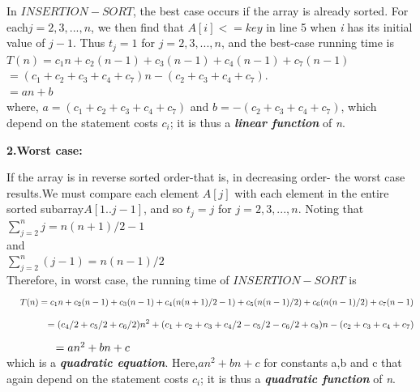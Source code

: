 \documentclass[12 pt,a4paper]{report}
\begin{document}
In $INSERTION-SORT$, the best case occurs if the array is already sorted. For each$ j=2,3,...,n$, we then find that $A[i]<=key$ in line 5 when \textit{i} has its initial value of $j-1$. Thus $t_j=1$ for $ j=2,3,...,n$, and the best-case running time is\\

$T(n)=c_1n+c_2(n-1)+c_3(n-1)+c_4(n-1) + c_7(n-1)$\\

\hspace{1cm}$=(c_1+c_2+c_3+c_4+c_7)n-(c_2+c_3+c_4+c_7).$\\

\hspace{1cm}$=an+b$\\

where, $a=(c_1+c_2+c_3+c_4+c_7)$ and $b=-(c_2+c_3+c_4+c_7)$, which depend on the statement costs $c_i$; it is thus a \textbf{\textit{linear function}} of \textit{n}.\\

\newpage

\textbf{2.Worst case:}

If the array is in reverse sorted order-that is, in decreasing order- the worst case results.We must compare each element $A[j]$ with each element in the entire sorted subarray$A[1..j-1]$, and so $t_j=j$ for $j=2,3,...,n$. Noting that \\

$\sum_{j=2}^nj=n(n+1)/2-1$\\

and\\

$\sum_{j=2}^n(j-1)=n(n-1)/2$\\

Therefore, in worst case, the running time of $INSERTION-SORT$ is\\
$$\hspace{0.5cm}T(n)=c_1n+c_2(n-1)+c_3(n-1)+c_4(n(n+1)/2-1)+c_5(n(n-1)/2)+ c_6(n(n-1)/2)+c_7(n-1)$$
$$\hspace{1.5cm}=(c_4/2+c_5/2+c_6/2)n^2+(c_1+c_2+c_3+c_4/2-c_5/2-c_6/2+c_8)n-(c_2+c_3+c_4+c_7)$$
$\hspace{1.5cm}=an^2+bn+c$\\

which is a \textbf{\textit{ quadratic equation}}. Here,$an^2+bn+c$ for constants a,b and c that again depend on the statement costs $c_i$; it is thus a \textbf{\textit{quadratic function}} of \textit{n}.\\
\newpage
\end{document}
